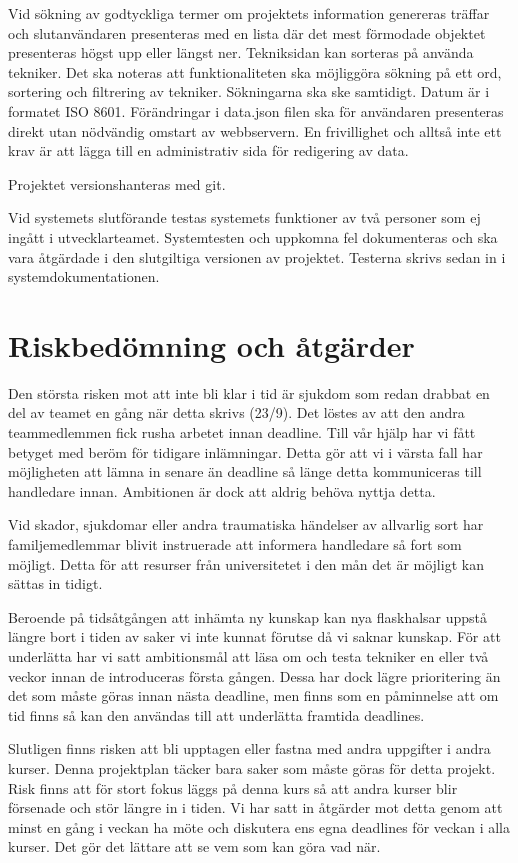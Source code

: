 \documentclass{TDP003mall}
\begin{document}
Vid sökning av godtyckliga termer om projektets information genereras träffar och slutanvändaren presenteras med en lista där det mest förmodade objektet presenteras högst upp eller längst ner. Tekniksidan kan sorteras på använda tekniker. Det ska noteras att funktionaliteten ska möjliggöra sökning på ett ord, sortering och filtrering av tekniker. Sökningarna ska ske samtidigt. Datum är i formatet ISO 8601. Förändringar i data.json filen ska för användaren presenteras direkt utan nödvändig omstart av webbservern. En frivillighet och alltså inte ett krav är att lägga till en administrativ sida för redigering av data.

Projektet versionshanteras med git.

Vid systemets slutförande testas systemets funktioner av två personer som ej ingått i utvecklarteamet. Systemtesten och uppkomna fel dokumenteras och ska vara åtgärdade i den slutgiltiga versionen av projektet. Testerna skrivs sedan in i systemdokumentationen.

\section{Riskbedömning och åtgärder}
Den största risken mot att inte bli klar i tid är sjukdom som redan drabbat en del av teamet en gång när detta skrivs (23/9). Det löstes av att den andra teammedlemmen fick rusha arbetet innan deadline. Till vår hjälp har vi fått betyget med beröm för tidigare inlämningar. Detta gör att vi i värsta fall har möjligheten att lämna in senare än deadline så länge detta kommuniceras till handledare innan. Ambitionen är dock att aldrig behöva nyttja detta.

Vid skador, sjukdomar eller andra traumatiska händelser av allvarlig sort har familjemedlemmar blivit instruerade att informera handledare så fort som möjligt. Detta för att resurser från universitetet i den mån det är möjligt kan sättas in tidigt.

Beroende på tidsåtgången att inhämta ny kunskap kan nya flaskhalsar uppstå längre bort i tiden av saker vi inte kunnat förutse då vi saknar kunskap. För att underlätta har vi satt ambitionsmål att läsa om och testa tekniker en eller två veckor innan de introduceras första gången. Dessa har dock lägre prioritering än det som måste göras innan nästa deadline, men finns som en påminnelse att om tid finns så kan den användas till att underlätta framtida deadlines.

Slutligen finns risken att bli upptagen eller fastna med andra uppgifter i andra kurser. Denna projektplan täcker bara saker som måste göras för detta projekt. Risk finns att för stort fokus läggs på denna kurs så att andra kurser blir försenade och stör längre in i tiden. Vi har satt in åtgärder mot detta genom att minst en gång i veckan ha möte och diskutera ens egna deadlines för veckan i alla kurser. Det gör det lättare att se vem som kan göra vad när.
\end{document}
